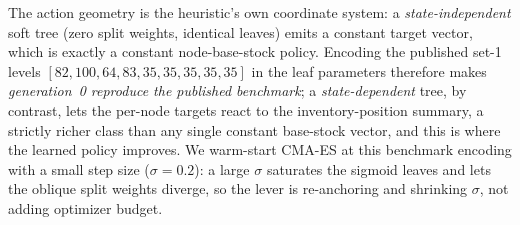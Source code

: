 \documentclass[11pt]{article}
\begin{document}
The action geometry is the heuristic's own coordinate system: a \emph{state-independent} soft tree
(zero split weights, identical leaves) emits a constant target vector, which is exactly a constant
node-base-stock policy. Encoding the published set-1 levels $[82,100,64,83,35,35,35,35,35]$ in the
leaf parameters therefore makes \emph{generation~0 reproduce the published benchmark}; a
\emph{state-dependent} tree, by contrast, lets the per-node targets react to the inventory-position
summary, a strictly richer class than any single constant base-stock vector, and this is where the
learned policy improves. We warm-start CMA-ES at this benchmark encoding with a small step size
($\sigma=0.2$): a large $\sigma$ saturates the sigmoid leaves and lets the oblique split weights
diverge, so the lever is re-anchoring and shrinking $\sigma$, not adding optimizer budget.
\end{document}
